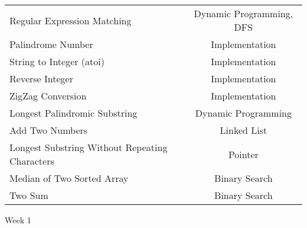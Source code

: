 \documentclass[paper=a4, fontsize=11pt]{scrartcl} %
\begin{document}
\begin{center}
\begin{longtable}{|l|c|}
    Regular Expression Matching &   Dynamic Programming, DFS  \\
    Palindrome Number   &   Implementation \\
    String to Integer (atoi)    &   Implementation  \\
    Reverse Integer &   Implementation \\
    ZigZag Conversion   &  Implementation  \\
    Longest Palindromic Substring   &   Dynamic Programming \\
    Add Two Numbers &   Linked List \\
    Longest Substring Without Repeating Characters  &   Pointer  \\
    Median of Two Sorted Array  &   Binary Search   \\
    Two Sum &      Binary Search    \\
    \hline

  \end{longtable}

  \pagebreak

  \begin{center}
    Week 1
  \end{center}
  \vspace{5mm}


\end{center}
\end{document}
